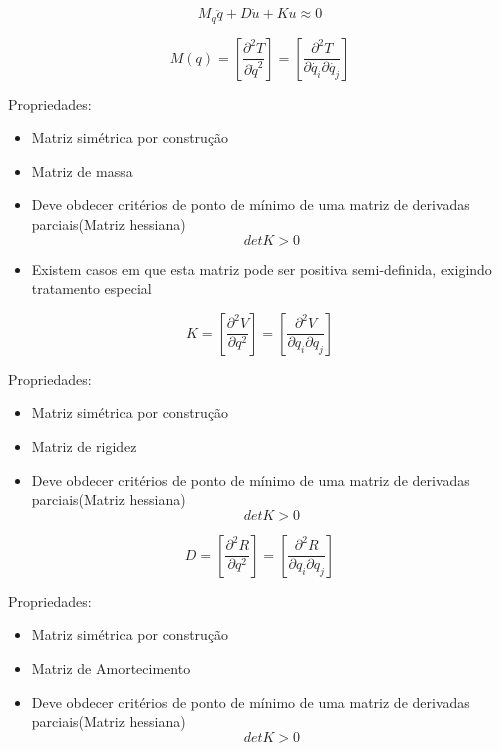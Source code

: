 $$ \boxed{M_q \ddot{q} + D\dot{u} + K u \approx 0} $$

\begin{namedtheorem}

$$ \boxed{M(q) = [\frac{\partial^2 T}{\partial \dot{q}^2}] = [\frac{\partial^2 T}{\partial \dot{q_i} \partial \dot{q_j}}]} $$

Propriedades:

\begin{itemize}
	\item Matriz simétrica por construção
	\item Matriz de massa
	\item Deve obdecer critérios de ponto de mínimo de uma matriz de derivadas parciais(Matriz hessiana)
	$$ det K > 0 $$
	\item Existem casos em que esta matriz pode ser positiva semi-definida, exigindo tratamento especial
\end{itemize}

\end{namedtheorem}

\begin{namedtheorem}

$$ \boxed{K = [\frac{\partial^2 V}{\partial q^2}] = [\frac{\partial^2 V}{\partial q_i \partial q_j}]} $$

Propriedades:

\begin{itemize}
	\item Matriz simétrica por construção
	\item Matriz de rigidez
	\item Deve obdecer critérios de ponto de mínimo de uma matriz de derivadas parciais(Matriz hessiana)
	$$ det K > 0 $$
\end{itemize}

\end{namedtheorem}

\begin{namedtheorem}

$$ \boxed{D = [\frac{\partial^2 R}{\partial q^2}] = [\frac{\partial^2 R}{\partial q_i \partial q_j}]} $$

Propriedades:

\begin{itemize}
	\item Matriz simétrica por construção
	\item Matriz de Amortecimento
	\item Deve obdecer critérios de ponto de mínimo de uma matriz de derivadas parciais(Matriz hessiana)
	$$ det K > 0 $$
\end{itemize}

\end{namedtheorem}

